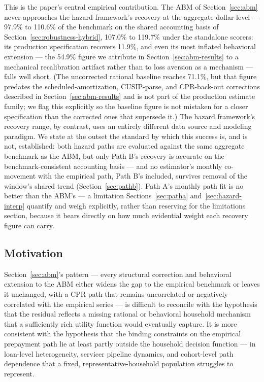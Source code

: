 \documentclass[12pt]{article}
\begin{document}
This is the paper's central empirical contribution. The ABM of Section~\ref{sec:abm} never approaches the hazard framework's recovery at the aggregate dollar level --- 97.9\% to 110.6\% of the benchmark on the shared accounting basis of Section~\ref{sec:robustness-hybrid}, 107.0\% to 119.7\% under the standalone scorers: its production specification recovers 11.9\%, and even its most inflated behavioral extension --- the 54.9\% figure we attribute in Section~\ref{sec:abm-results} to a mechanical recalibration artifact rather than to loss aversion as a mechanism --- falls well short. (The uncorrected rational baseline reaches 71.1\%, but that figure predates the scheduled-amortization, CUSIP-parse, and CPR-back-out corrections described in Section~\ref{sec:abm-results} and is not part of the production estimate family; we flag this explicitly so the baseline figure is not mistaken for a closer specification than the corrected ones that supersede it.) The hazard framework's recovery range, by contrast, uses an entirely different data source and modeling paradigm. We state at the outset the standard by which this success is, and is not, established: both hazard paths are evaluated against the same aggregate benchmark as the ABM, but only Path B's recovery is accurate on the benchmark-consistent accounting basis --- and no estimator's monthly co-movement with the empirical path, Path B's included, survives removal of the window's shared trend (Section~\ref{sec:pathb}). Path A's monthly path fit is no better than the ABM's --- a limitation Sections~\ref{sec:patha} and~\ref{sec:hazard-interp} quantify and weigh explicitly, rather than reserving for the limitations section, because it bears directly on how much evidential weight each recovery figure can carry.

\subsection{Motivation}\label{sec:hazard-motivation}

Section~\ref{sec:abm}'s pattern --- every structural correction and behavioral extension to the ABM either widens the gap to the empirical benchmark or leaves it unchanged, with a CPR path that remains uncorrelated or negatively correlated with the empirical series --- is difficult to reconcile with the hypothesis that the residual reflects a missing rational or behavioral household mechanism that a sufficiently rich utility function would eventually capture. It is more consistent with the hypothesis that the binding constraints on the empirical prepayment path lie at least partly outside the household decision function --- in loan-level heterogeneity, servicer pipeline dynamics, and cohort-level path dependence that a fixed, representative-household population struggles to represent.
\end{document}
